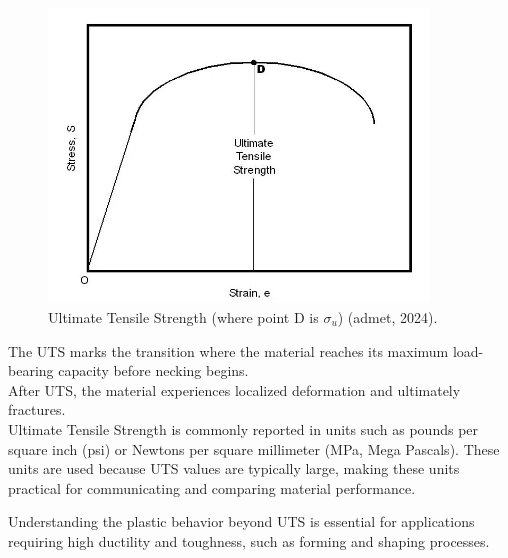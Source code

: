\documentclass{article}
\begin{document}
\begin{center}
    \begin{minipage}{0.47\textwidth}\centering
        \begin{figure}[H]
            \centering
            \includegraphics[width=0.9\textwidth]{images/ultimate-tensile-strength.png}
            \caption{Ultimate Tensile Strength (where point D is $\sigma_{u}$) (admet, 2024).}
            \label{fig:uts}
        \end{figure}
    \end{minipage}\hfil
    \begin{minipage}{0.45\textwidth}
        The UTS marks the transition where the material reaches its maximum load-bearing capacity before necking begins.\\[8pt] 
        After UTS, the material experiences localized deformation and ultimately fractures.\\[8pt]
        Ultimate Tensile Strength is commonly reported in units such as pounds per square inch (psi) or Newtons per square millimeter (MPa, Mega Pascals). These units are used because UTS values are typically large, making these units practical for communicating and comparing material performance.    
    \end{minipage}
\end{center}
Understanding the plastic behavior beyond UTS is essential for applications requiring high ductility and toughness, such as forming and shaping processes.


\newpage
\end{document}
